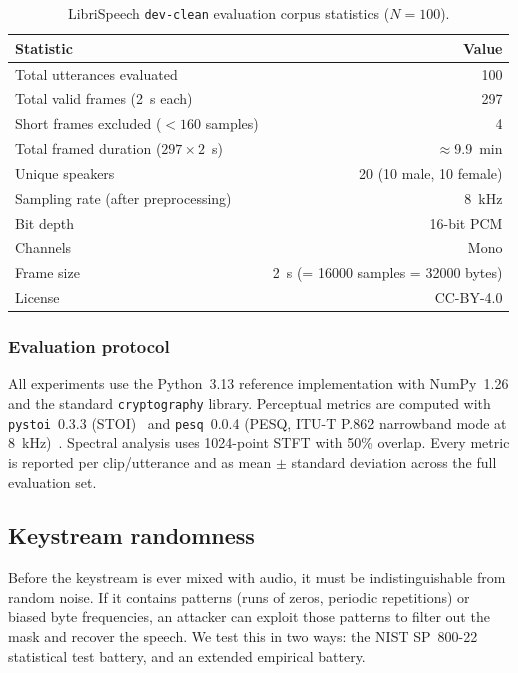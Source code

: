 \documentclass[pdflatex,sn-mathphys-num]{sn-jnl}%
\theoremstyle{thmstyleone}%
\theoremstyle{thmstyletwo}%
\theoremstyle{thmstylethree}%
\begin{document}
\begin{table}[t]
\centering
\caption{LibriSpeech \texttt{dev-clean} evaluation corpus statistics ($N=100$).}
\label{tab:librispeech_stats}
\begin{tabular}{@{}lr@{}}
\toprule
Statistic & Value \\
\midrule
Total utterances evaluated & 100 \\
Total valid frames (2~s each) & 297 \\
Short frames excluded ($<160$ samples) & 4 \\
Total framed duration ($297\times2$~s) & $\approx$9.9~min \\
Unique speakers & 20 (10 male, 10 female) \\
Sampling rate (after preprocessing) & 8~kHz \\
Bit depth & 16-bit PCM \\
Channels & Mono \\
Frame size & 2~s (= 16000 samples = 32000 bytes) \\
License & CC-BY-4.0 \\
\bottomrule
\end{tabular}
\end{table}

\subsubsection{Evaluation protocol}
All experiments use the Python~3.13 reference implementation with NumPy~1.26 
and the standard \texttt{cryptography} library. Perceptual metrics are 
computed with \texttt{pystoi}~0.3.3 (STOI)~\cite{taal2011} and 
\texttt{pesq}~0.0.4 (PESQ, ITU-T P.862 narrowband mode at 8~kHz)~\cite{rix2001pesq}. 
Spectral analysis uses 1024-point STFT with 50\% overlap. Every metric is 
reported per clip/utterance and as mean $\pm$ standard deviation across 
the full evaluation set.

\subsection{Keystream randomness}
\label{sec:keystream}

Before the keystream is ever mixed with audio, it must be indistinguishable from random noise. If it contains patterns (runs of zeros, periodic repetitions) or biased byte frequencies, an attacker can exploit those patterns to filter out the mask and recover the speech. We test this in two ways: the NIST SP~800-22 statistical test battery, and an extended empirical battery.
\end{document}
